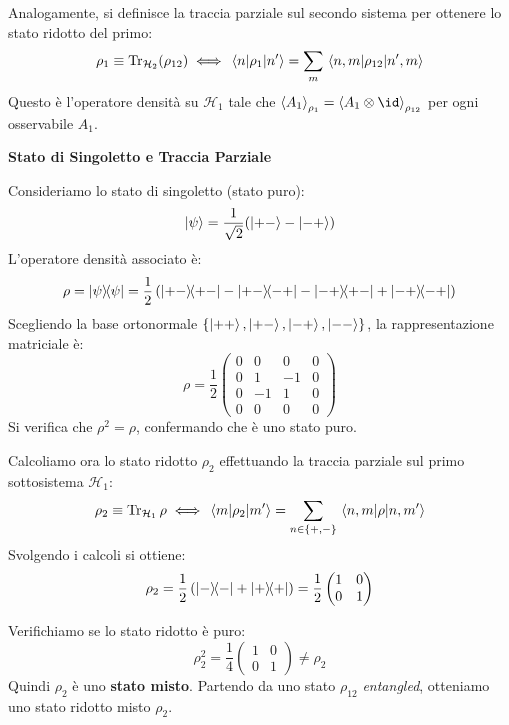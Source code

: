 Analogamente, si definisce la traccia parziale sul secondo sistema per ottenere lo stato ridotto del primo:
\[
    \rho_1 \equiv \Tr_{\mathcal{H}_2}(\rho_{12}) \iff \mel{n}{\rho_1}{n'} = \sum_m \mel{n,m}{\rho_{12}}{n',m}
\]
Questo è l'operatore densità su $\mathcal{H}_1$ tale che $\ev{A_1}_{\rho_1} = \ev{A_1 \otimes \id}_{\rho_{12}}$ per ogni osservabile $A_1$.

\begin{example}
    \textbf{Stato di Singoletto e Traccia Parziale}

    Consideriamo lo stato di singoletto (stato puro):
    \[
        \ket{\psi} = \frac{1}{\sqrt{2}} (\ket{+-} - \ket{-+})
    \]
    L'operatore densità associato è:
    \[
        \rho = \dyad{\psi}{\psi} = \frac{1}{2} \left( \dyad{+-}{+-} - \dyad{+-}{-+} - \dyad{-+}{+-} + \dyad{-+}{-+} \right)
    \]
    Scegliendo la base ortonormale \( \{ \ket{++}, \ket{+-}, \ket{-+}, \ket{--} \} \), la rappresentazione matriciale è:
    \[
        \rho = \frac{1}{2}
        \begin{pmatrix}
            0 & 0 & 0 & 0 \\
            0 & 1 & -1 & 0 \\
            0 & -1 & 1 & 0 \\
            0 & 0 & 0 & 0
        \end{pmatrix}
    \]
    Si verifica che \( \rho^2 = \rho \), confermando che è uno stato puro.

    Calcoliamo ora lo stato ridotto \( \rho_2 \) effettuando la traccia parziale sul primo sottosistema \( \mathcal{H}_1 \):
    \[
        \rho_2 \equiv \Tr_{\mathcal{H}_1} \rho \iff \mel{m}{\rho_2}{m'} = \sum_{n \in \{+,-\}} \mel{n,m}{\rho}{n,m'}
    \]
    Svolgendo i calcoli si ottiene:
    \[
        \rho_2 = \frac{1}{2} \left( \dyad{-}{-} + \dyad{+}{+} \right) = \frac{1}{2} 
        \begin{pmatrix} 
            1 & 0 \\ 
            0 & 1 
        \end{pmatrix}
    \]
    
    Verifichiamo se lo stato ridotto è puro:
    \[
        \rho_2^2 = \frac{1}{4} 
        \begin{pmatrix} 
            1 & 0 \\ 
            0 & 1 
        \end{pmatrix} 
        \neq \rho_2
    \]
    Quindi \( \rho_2 \) è uno \textbf{stato misto}.
    Partendo da uno stato \( \rho_{12} \) \textit{entangled}, otteniamo uno stato ridotto misto \( \rho_2 \).
\end{example}

